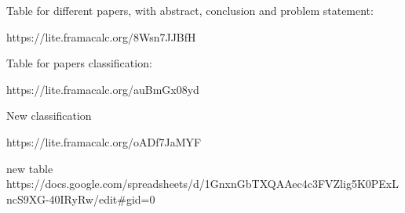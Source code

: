 \documentclass[a4paper,10pt]{article}
\begin{document}
Table for different papers, with abstract, conclusion and problem statement:

https://lite.framacalc.org/8Wsn7JJBfH

Table for papers classification:

https://lite.framacalc.org/auBmGx08yd

New classification

https://lite.framacalc.org/oADf7JaMYF

new table 
https://docs.google.com/spreadsheets/d/1GnxnGbTXQAAec4c3FVZlig5K0PExLncS9XG-40IRyRw/edit#gid=0










\end{document}
